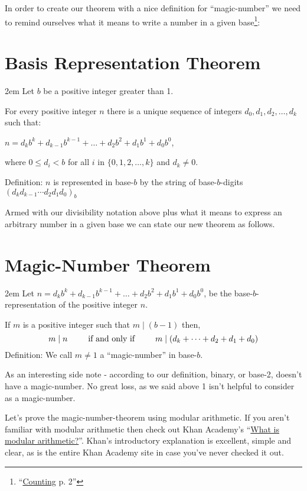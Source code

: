 \documentclass{article}
\newenvironment{jprIn}{\begin{adjustwidth}{2em}{}}{\end{adjustwidth}}
\begin{document}
In order to create our theorem with a 
nice definition for ``magic-number''
we need to remind ourselves 
what it means to write a number in a given
base\footnote{``\href{https://www.dropbox.com/s/bwmrffmkcidnf27/basisReprThm.pdf?dl=0} {Counting} p. 2''}:

\section*{Basis Representation Theorem}
\begin{jprIn}
Let $b$ be a positive integer greater than 1.

For every positive integer $n$ there is a unique sequence
of integers $d_0, d_1, d_2,\dots{},d_k$ such that:

\hspace{3em}$n=d_kb^k+d_{k-1}b^{k-1}+\dots+d_2b^2+d_1b^1+d_0b^0$,

where $0\le{}d_i<b$ for all $i$ in $\{0,1,2,\dots{},k\}$ and $d_k\ne0$.

Definition: $n$ is represented in base-$b$ by the string
of base-$b$-digits $(d_kd_{k-1}{\cdots}d_2d_1d_0)_b$
\end{jprIn}

\bigskip
Armed with our divisibility notation above plus what it means to
express an arbitrary number in a given base we can state our new theorem as follows.
\section*{Magic-Number Theorem}
\begin{jprIn}
Let
$n=d_kb^k+d_{k-1}b^{k-1}+\dots+d_2b^2+d_1b^1+d_0b^0$,
be the base-$b$-representation of the positive integer $n$.

If $m$ is a positive integer such that $m\mid{}(b-1)$ then,
\[m\mid{}n \text{\hspace{2.5em}if and only if\hspace{2.5em}}m\mid{}(d_k+\dots+d_2+d_1+d_0)\]
Definition: We call $m\ne1$ a ``magic-number'' in base-$b$.
\end{jprIn}
\bigskip

As an interesting side note - according to our definition, binary,
or base-2, doesn't have a magic-number.
No great loss, as we said above 1 isn't helpful to consider as a magic-number. 

Let's prove the magic-number-theorem using 
modular arithmetic. If you aren't familiar with modular arithmetic
then check out Khan Academy's
``\href{https://www.khanacademy.org/computing/computer-science/cryptography/modarithmetic/a/what-is-modular-arithmetic}{What is modular arithmetic?}''.
Khan's introductory explanation is excellent, simple and clear,
as is the entire Khan Academy site in case you've never checked it out.
\end{document}
